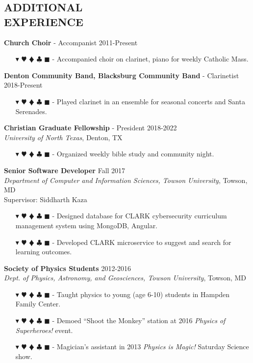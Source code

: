 \documentclass[overlapped, 10pt]{res} %
\newcommand{\physics}{$\blacktriangledown$}
\newcommand{\biochem}{$\varheartsuit$}
\newcommand{\shannon}{$\vardiamondsuit$}
\newcommand{\classic}{$\clubsuit$}
\newcommand{\quantum}{$\blacksquare$}
\newcommand{\physicscolor}{\color{YellowOrange}}
\newcommand{\biochemcolor}{\color{Emerald}}
\newcommand{\shannoncolor}{\color{Goldenrod}}
\newcommand{\classiccolor}{\color{Cyan}}
\newcommand{\quantumcolor}{\color{RedOrange}}
\newcommand{\tag}[1]{
    {\IfSubStr{#1}{\physics}{\physicscolor}{\color{White}}\physics}
    {\IfSubStr{#1}{\biochem}{\biochemcolor}{\color{White}}\biochem}
    {\IfSubStr{#1}{\shannon}{\shannoncolor}{\color{White}}\shannon}
    {\IfSubStr{#1}{\classic}{\classiccolor}{\color{White}}\classic}
    {\IfSubStr{#1}{\quantum}{\quantumcolor}{\color{White}}\quantum}
}
\begin{document}
\begin{resume}
\section{ADDITIONAL\\EXPERIENCE}

\textbf{Church Choir} - Accompanist \hfill 2011-Present
\begin{itemize} \itemsep -2pt %
\item[\tag{}-] Accompanied choir on clarinet, piano for weekly Catholic Mass.
\end{itemize}

\textbf{Denton Community Band, Blacksburg Community Band} - Clarinetist \hfill 2018-Present
\begin{itemize} \itemsep -2pt %
\item[\tag{}-] Played clarinet in an ensemble for seasonal concerts and Santa Serenades.
\end{itemize}

\textbf{Christian Graduate Fellowship} - President \hfill 2018-2022 \\
\textit{University of North Texas}, Denton, TX
\begin{itemize} \itemsep -2pt %
\item[\tag{}-] Organized weekly bible study and community night.
\end{itemize}

\textbf{Senior Software Developer} \hfill Fall 2017 \\
\textit{Department of Computer and Information Sciences, Towson University}, Towson, MD \\
Supervisor: Siddharth Kaza
\begin{itemize} \itemsep -2pt %
\item[\tag{\classic}-] Designed database for CLARK cybersecurity curriculum management system using MongoDB, Angular.
\item[\tag{\classic}-] Developed CLARK microservice to suggest and search for learning outcomes.
\end{itemize}

\textbf{Society of Physics Students} \hfill 2012-2016 \\
\textit{Dept. of Physics, Astronomy, and Geosciences, Towson University}, Towson, MD
\begin{itemize} \itemsep -2pt %
\item[\tag{\physics}-] Taught physics to young (age 6-10) students in Hampden Family Center.
\item[\tag{\physics}-] Demoed ``Shoot the Monkey'' station at 2016 \textit{Physics of Superheroes!} event.
\item[\tag{\physics}-] Magician's assistant in 2013 \textit{Physics is Magic!} Saturday Science show.
\end{itemize}


\end{resume}
\end{document}
